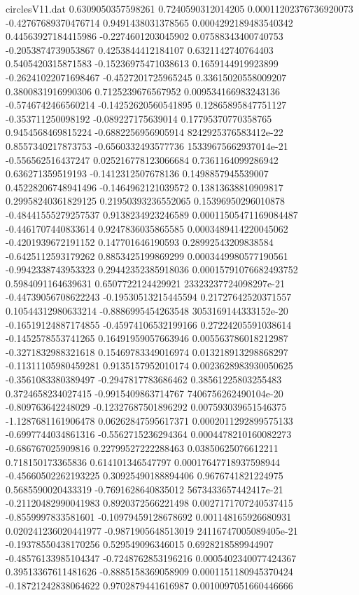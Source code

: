 \begin{filecontents}{circlesV11.dat}
0.6309050357598261	0.7240590312014205	0.00011202376736920073
-0.42767689370476714	0.9491438031378565	0.0004292189483540342
0.44563927184415986	-0.2274601203045902	0.07588343400740753
-0.2053874739053867	0.4253844412184107	0.6321142740764403
0.5405420315871583	-0.15236975471038613	0.1659144919923899
-0.26241022071698467	-0.4527201725965245	0.33615020558009207
0.3800831916990306	0.7125239676567952	0.009534166983243136
-0.5746742466560214	-0.14252620560541895	0.12865895847751127
-0.353711250098192	-0.089227175639014	0.17795370770358765
0.9454568469815224	-0.6882256956905914	8242925376583412e-22
0.8557340217873753	-0.6560332493577736	15339675662937014e-21
-0.556562516437247	0.025216778123066684	0.7361164099286942
0.636271359519193	-0.1412312507678136	0.1498857945539007
0.45228206748941496	-0.1464962121039572	0.13813638810909817
0.29958240361829125	0.21950393236552065	0.15396950296010878
-0.48441555279257537	0.9138234923246589	0.00011505471169084487
-0.4461707440833614	0.9247836035865585	0.0003489414220045062
-0.4201939672191152	0.147701646190593	0.28992543209838584
-0.6425112593179262	0.8853425199869299	0.0003449980577190561
-0.9942338743953323	0.29442352385918036	0.00015791076682493752
0.5984091164639631	0.6507722124429921	23323237724098297e-21
-0.44739056708622243	-0.19530513215445594	0.21727642520371557
0.10544312980633214	-0.8886995454263548	3053169144333152e-20
-0.16519124887174855	-0.45974106532199166	0.27224205591038614
-0.1452578553741265	0.16491959057663946	0.005563786018212987
-0.3271832988321618	0.15469783349016974	0.013218913298868297
-0.11311105980459281	0.9135157952010174	0.0023628983930050625
-0.3561083380389497	-0.2947817783686462	0.38561225803255483
0.3724658234027415	-0.9915409863714767	7406756262490104e-20
-0.809763642248029	-0.12327687501896292	0.007593039651546375
-1.1287681161906478	0.06262847595617371	0.0002011292899575133
-0.6997744034861316	-0.5562715236294364	0.0004478210160082273
-0.686767025909816	0.22799527222288463	0.03850625076612211
0.718150173365836	0.614101346547797	0.00017647718937598944
-0.45660502262193225	0.30925490188894406	0.9676741821224975
0.5685590020433319	-0.7691628640835012	5673433657442417e-21
-0.21120482990041983	0.8920372566221498	0.0027171707240537415
-0.8559997833581601	-0.10979459128678692	0.001148165926680931
0.020241236020441977	-0.9871905648513019	24116747005089405e-21
-0.19378550438170256	0.529549096346015	0.6928218589944907
-0.48576133985104347	-0.7248762853196216	0.0005402340077424367
0.39513367611481626	-0.8885158369058909	0.0001151180945370424
-0.18721242838064622	0.9702879441616987	0.0010097051660446666

\end{filecontents}
